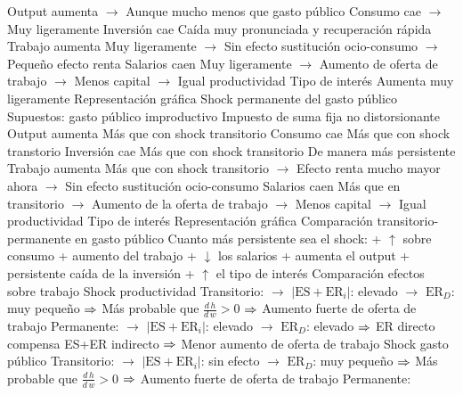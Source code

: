\documentclass{nuevotema}
\begin{document}
\begin{esquemal}
				\4 Output aumenta
				\4[] $\to$ Aunque mucho menos que gasto público
				\4 Consumo cae
				\4[] $\to$ Muy ligeramente
				\4 Inversión cae
				\4[] Caída muy pronunciada y recuperación rápida
				\4 Trabajo aumenta
				\4[] Muy ligeramente
				\4[] $\to$ Sin efecto sustitución ocio-consumo
				\4[] $\to$ Pequeño efecto renta
				\4 Salarios caen
				\4[] Muy ligeramente
				\4[] $\to$ Aumento de oferta de trabajo
				\4[] $\to$ Menos capital
				\4[] $\to$ Igual productividad
				\4 Tipo de interés
				\4[] Aumenta muy ligeramente
				\4 Representación gráfica
				\4[] 
			\3 Shock permanente del gasto público
				\4 Supuestos:
				\4[] gasto público improductivo
				\4[] Impuesto de suma fija no distorsionante
				\4 Output aumenta
				\4[] Más que con shock transitorio
				\4 Consumo cae
				\4[] Más que con shock transtorio
				\4 Inversión cae
				\4[] Más que con shock transitorio
				\4[] De manera más persistente
				\4 Trabajo aumenta
				\4[] Más que con shock transitorio
				\4[] $\to$ Efecto renta mucho mayor ahora
				\4[] $\to$ Sin efecto sustitución ocio-consumo
				\4 Salarios caen
				\4[] Más que en transitorio
				\4[] $\to$ Aumento de la oferta de trabajo
				\4[] $\to$ Menos capital
				\4[] $\to$ Igual productividad
				\4 Tipo de interés
				\4 Representación gráfica
				\4[] 
			\3 Comparación transitorio-permanente en gasto público
				\4 Cuanto más persistente sea el shock:
				\4[Consumo] + $\uparrow$ sobre consumo
				\4[Trabajo] + aumento del trabajo
				\4[Salarios] + $\downarrow$ los salarios
				\4[Output] + aumenta el output
				\4[Inversión] + persistente caída de la inversión
				 + $\uparrow$ el tipo de interés
			\3 Comparación efectos sobre trabajo
				\4 Shock productividad
				\4[] Transitorio:
				\4[] $\to$ $\left| \text{ES} + \text{ER}_i\right|$: elevado
				\4[] $\to$ $\text{ER}_D$: muy pequeño
				\4[] $\Rightarrow$ Más probable que $\frac{d \, h}{d \, w} > 0$
				\4[] $\Rightarrow$ Aumento fuerte de oferta de trabajo
				\4[] Permanente:
				\4[] $\to$ $\left| \text{ES} + \text{ER}_i\right|$: elevado
				\4[] $\to$ $\text{ER}_D$: elevado
				\4[] $\Rightarrow$ ER directo compensa ES+ER indirecto
				\4[] $\Rightarrow$ Menor aumento de oferta de trabajo
				\4 Shock gasto público
				\4[] Transitorio:
				\4[] $\to$ $\left| \text{ES} + \text{ER}_i\right|$: sin efecto
				\4[] $\to$ $\text{ER}_D$: muy pequeño
				\4[] $\Rightarrow$ Más probable que $\frac{d \, h}{d \, w} > 0$
				\4[] $\Rightarrow$ Aumento fuerte de oferta de trabajo
				\4[] Permanente:

\end{esquemal}
\end{document}
